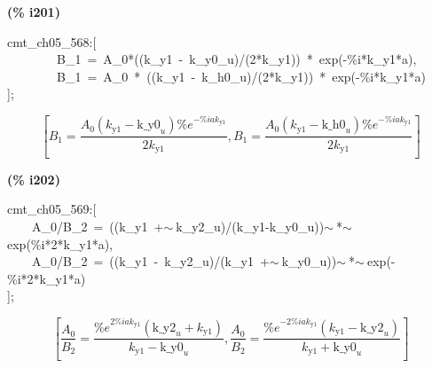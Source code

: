 \documentclass[fleqn]{article}
\begin{document}
\noindent
\begin{minipage}[t]{4.000000em}\color{red}\bfseries
(\% i201)	
\end{minipage}
\begin{minipage}[t]{\textwidth}\color{blue}
cmt\_ch05\_568:[\\
\ \ \ \ \ \ \ \ B\_1\ =\ A\_0*((k\_y1\ -\ k\_y0\_u)/(2*k\_y1))\ *\ exp(-\%i*k\_y1*a),\\
\ \ \ \ \ \ \ \ B\_1\ =\ A\_0\ *\ ((k\_y1\ -\ k\_h0\_u)/(2*k\_y1))\ *\ exp(-\%i*k\_y1*a)\\
];
\end{minipage}
\[\displaystyle \tag{\% o201} 
\left[ {B_1}=\frac{{A_0} \left( {k_{\ensuremath{\mathrm{y1}}}}-{{\ensuremath{\mathrm{k\_ y0}}}_u}\right)  {{\% e}^{-\% i a {k_{\ensuremath{\mathrm{y1}}}}}}}{2 {k_{\ensuremath{\mathrm{y1}}}}}\operatorname{,}{B_1}=\frac{{A_0} \left( {k_{\ensuremath{\mathrm{y1}}}}-{{\ensuremath{\mathrm{k\_ h0}}}_u}\right)  {{\% e}^{-\% i a {k_{\ensuremath{\mathrm{y1}}}}}}}{2 {k_{\ensuremath{\mathrm{y1}}}}}\right] \mbox{}
\]


\noindent
\begin{minipage}[t]{4.000000em}\color{red}\bfseries
(\% i202)	
\end{minipage}
\begin{minipage}[t]{\textwidth}\color{blue}
cmt\_ch05\_569:[\\
\ \ \ \ A\_0/B\_2\ =\ ((k\_y1\ +\ensuremath{\sim\ }k\_y2\_u)/(k\_y1-k\_y0\_u))\ensuremath{\sim\ }*\ensuremath{\sim\ }exp(\%i*2*k\_y1*a),\\
\ \ \ \ A\_0/B\_2\ =\ ((k\_y1\ -\ k\_y2\_u)/(k\_y1\ +\ensuremath{\sim\ }k\_y0\_u))\ensuremath{\sim\ }*\ensuremath{\sim\ }exp(-\%i*2*k\_y1*a)\\
];
\end{minipage}
\[\displaystyle \tag{\% o202} 
\left[ \frac{{A_0}}{{B_2}}=\frac{{{\% e}^{2 \% i a {k_{\ensuremath{\mathrm{y1}}}}}} \left( {{\ensuremath{\mathrm{k\_ y2}}}_u}+{k_{\ensuremath{\mathrm{y1}}}}\right) }{{k_{\ensuremath{\mathrm{y1}}}}-{{\ensuremath{\mathrm{k\_ y0}}}_u}}\operatorname{,}\frac{{A_0}}{{B_2}}=\frac{{{\% e}^{-2 \% i a {k_{\ensuremath{\mathrm{y1}}}}}} \left( {k_{\ensuremath{\mathrm{y1}}}}-{{\ensuremath{\mathrm{k\_ y2}}}_u}\right) }{{k_{\ensuremath{\mathrm{y1}}}}+{{\ensuremath{\mathrm{k\_ y0}}}_u}}\right] \mbox{}
\]
\end{document}
